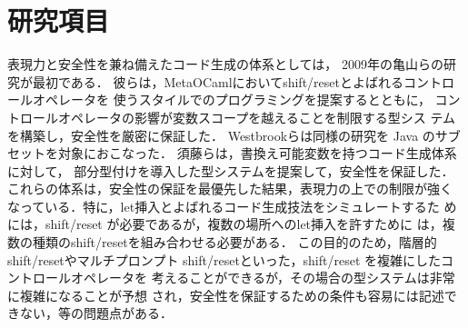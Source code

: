 \documentclass[10pt,a4j,xcolor=dvipsnames,twocolumn]{jarticle}
\theoremstyle{definition}
\begin{document}


\section{研究項目}


表現力と安全性を兼ね備えたコード生成の体系としては，
2009年の亀山らの研究\cite{Kameyama2009}が最初である．
彼らは，MetaOCamlにおいてshift/resetとよばれるコントロールオペレータを
使うスタイルでのプログラミングを提案するとともに，
コントロールオペレータの影響が変数スコープを越えることを制限する型シス
テムを構築し，安全性を厳密に保証した．
Westbrookら\cite{Westbrook}は同様の研究を Java のサブセットを対象におこなった．
須藤ら\cite{Sudo2014}は，書換え可能変数を持つコード生成体系に対して，
部分型付けを導入した型システムを提案して，安全性を保証した．
これらの体系は，安全性の保証を最優先した結果，表現力の上での制限が強く
なっている．特に，let挿入とよばれるコード生成技法をシミュレートするた
めには，shift/reset が必要であるが，複数の場所へのlet挿入を許すために
は，複数の種類のshift/resetを組み合わせる必要がある．
この目的のため，階層的shift/resetやマルチプロンプト
shift/resetといった，shift/reset を複雑にしたコントロールオペレータを
考えることができるが，その場合の型システムは非常に複雑になることが予想
され，安全性を保証するための条件も容易には記述できない，等の問題点がある．
\end{document}
